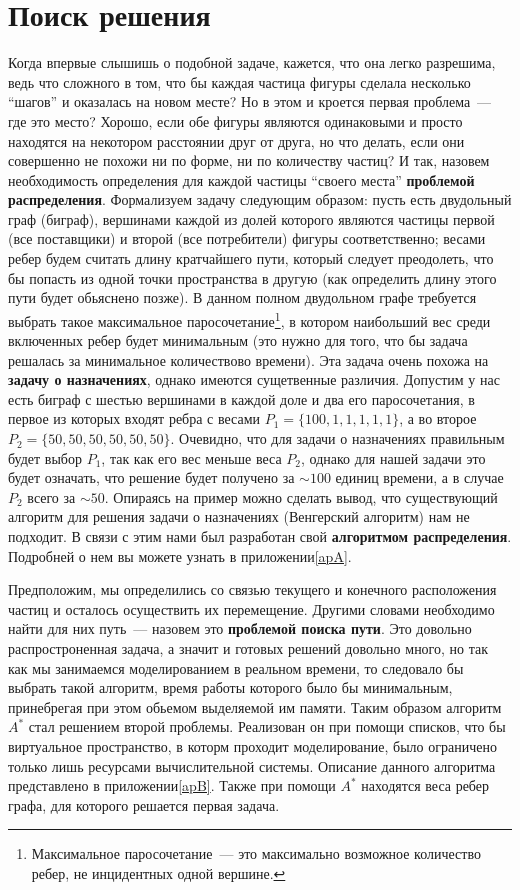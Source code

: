 \documentclass[a4paper,10pt]{article}
\begin{document}
\newpage

\section{Поиск решения}
 Когда впервые слышишь о подобной задаче, кажется, что она легко
разрешима, ведь что сложного в том, что бы каждая частица фигуры
сделала несколько ``шагов'' и оказалась на новом месте? Но в этом
и кроется первая проблема~--- где это место? Хорошо, если
обе фигуры являются одинаковыми и просто находятся на некотором
расстоянии друг от друга, но что делать, если они совершенно
не похожи ни по форме, ни по количеству частиц? И так,
назовем необходимость определения для каждой частицы ``своего места''
{\bfseries проблемой распределения}.
 Формализуем задачу следующим
образом: пусть есть двудольный граф (биграф), вершинами каждой из долей
которого являются частицы первой (все поставщики) и второй (все потребители) фигуры соответственно;
весами ребер будем считать длину кратчайшего пути, который следует
преодолеть, что бы попасть из одной точки пространства в другую (как
определить длину этого пути будет обьяснено позже). В данном полном
двудольном графе требуется выбрать такое максимальное паросочетание\footnote{
Максимальное паросочетание~--- это максимально возможное количество ребер, не
инцидентных одной вершине.},
в котором наибольший вес среди включенных ребер будет минимальным (это нужно
для того, что бы задача решалась за минимальное количествово времени).
Эта задача очень похожа на {\bfseries задачу о назначениях}, однако имеются
сущетвенные различия. Допустим у нас есть биграф с шестью вершинами в каждой доле и
два его паросочетания, в первое из которых входят ребра с весами
$P_1 = \{100, 1, 1, 1, 1, 1\}$, а во второе $P_2 = \{50, 50, 50, 50, 50, 50\}$.
Очевидно, что для задачи о назначениях правильным будет выбор $P_1$, так как
его вес меньше веса $P_2$, однако для нашей задачи это будет означать,
что решение будет получено за $\sim100$ единиц времени, а в случае $P_2$ всего за $\sim50$.
Опираясь на пример можно сделать вывод, что существующий алгоритм для решения задачи
о назначениях (Венгерский алгоритм) нам не подходит. В связи с этим нами был разработан свой
{\bfseries алгоритмом распределения}. Подробней о нем вы можете узнать в приложении\ref{apA}.

Предположим, мы определились со связью текущего и конечного
расположения частиц и осталось осуществить их перемещение.
Другими словами необходимо найти для них путь~--- назовем это
{\bfseries проблемой поиска пути}.
 Это довольно распростроненная задача, а значит и готовых решений довольно
много, но так как мы занимаемся моделированием в реальном времени, то следовало бы выбрать
такой алгоритм, время работы которого было бы минимальным, принебрегая при
этом обьемом выделяемой им памяти. Таким образом алгоритм~$A^*$ стал
решением второй проблемы. Реализован он при помощи списков, что бы
виртуальное пространство, в которм проходит моделирование, было ограничено
только лишь ресурсами вычислительной системы. Описание данного алгоритма
представлено в приложении\ref{apB}. Также при помощи $A^*$ находятся веса
ребер графа, для которого решается первая задача.
\end{document}
